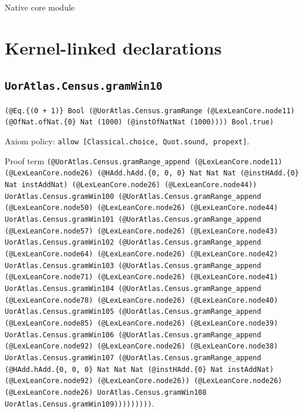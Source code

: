\documentclass[11pt]{article}
\begin{document}
\begin{center}{\LARGE Native core module}\end{center}
\section*{Kernel-linked declarations}
\subsection*{\texttt{UorAtlas.Census.gramWin10}}
\noindent\texttt{(@Eq.\{(0 + 1)\} Bool (@UorAtlas.Census.gramRange (@LexLeanCore.node11) (@OfNat.ofNat.\{0\} Nat (1000) (@instOfNatNat (1000)))) Bool.true)}\par
\noindent Axiom policy: \texttt{allow [Classical.choice, Quot.sound, propext]}.\par
\noindent Proof term \texttt{(@UorAtlas.Census.gramRange\_append (@LexLeanCore.node11) (@LexLeanCore.node26) (@HAdd.hAdd.\{0, 0, 0\} Nat Nat Nat (@instHAdd.\{0\} Nat instAddNat) (@LexLeanCore.node26) (@LexLeanCore.node44)) UorAtlas.Census.gramWin100 (@UorAtlas.Census.gramRange\_append (@LexLeanCore.node50) (@LexLeanCore.node26) (@LexLeanCore.node44) UorAtlas.Census.gramWin101 (@UorAtlas.Census.gramRange\_append (@LexLeanCore.node57) (@LexLeanCore.node26) (@LexLeanCore.node43) UorAtlas.Census.gramWin102 (@UorAtlas.Census.gramRange\_append (@LexLeanCore.node64) (@LexLeanCore.node26) (@LexLeanCore.node42) UorAtlas.Census.gramWin103 (@UorAtlas.Census.gramRange\_append (@LexLeanCore.node71) (@LexLeanCore.node26) (@LexLeanCore.node41) UorAtlas.Census.gramWin104 (@UorAtlas.Census.gramRange\_append (@LexLeanCore.node78) (@LexLeanCore.node26) (@LexLeanCore.node40) UorAtlas.Census.gramWin105 (@UorAtlas.Census.gramRange\_append (@LexLeanCore.node85) (@LexLeanCore.node26) (@LexLeanCore.node39) UorAtlas.Census.gramWin106 (@UorAtlas.Census.gramRange\_append (@LexLeanCore.node92) (@LexLeanCore.node26) (@LexLeanCore.node38) UorAtlas.Census.gramWin107 (@UorAtlas.Census.gramRange\_append (@HAdd.hAdd.\{0, 0, 0\} Nat Nat Nat (@instHAdd.\{0\} Nat instAddNat) (@LexLeanCore.node92) (@LexLeanCore.node26)) (@LexLeanCore.node26) (@LexLeanCore.node26) UorAtlas.Census.gramWin108 UorAtlas.Census.gramWin109)))))))))}.\par
\end{document}
